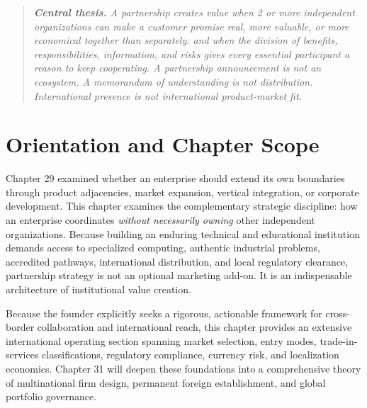 
\begin{quote}
\itshape
\textbf{Central thesis.} A partnership creates value when 2 or more independent organizations can make a customer promise real, more valuable, or more economical together than separately: and when the division of benefits, responsibilities, information, and risks gives every essential participant a reason to keep cooperating. A partnership announcement is not an ecosystem. A memorandum of understanding is not distribution. International presence is not international product-market fit.
\end{quote}

\section*{Orientation and Chapter Scope}

Chapter 29 examined whether an enterprise should extend its own boundaries through product adjacencies, market expansion, vertical integration, or corporate development. This chapter examines the complementary strategic discipline: how an enterprise coordinates \textit{without necessarily owning} other independent organizations. Because building an enduring technical and educational institution demands access to specialized computing, authentic industrial problems, accredited pathways, international distribution, and local regulatory clearance, partnership strategy is not an optional marketing add-on. It is an indispensable architecture of institutional value creation.

Because the founder explicitly seeks a rigorous, actionable framework for cross-border collaboration and international reach, this chapter provides an extensive international operating section spanning market selection, entry modes, trade-in-services classifications, regulatory compliance, currency risk, and localization economics. Chapter 31 will deepen these foundations into a comprehensive theory of multinational firm design, permanent foreign establishment, and global portfolio governance.


